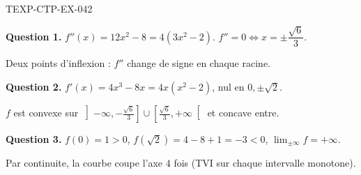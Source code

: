 \begin{corrige}{TEXP-CTP-EX-042}

\textbf{Question 1.} $f''(x) = 12x^2 - 8 = 4(3x^2-2)$. $f'' = 0 \iff x = \pm\dfrac{\sqrt{6}}{3}$.


Deux points d'inflexion : $f''$ change de signe en chaque racine.

\textbf{Question 2.} $f'(x) = 4x^3 - 8x = 4x(x^2-2)$, nul en $0, \pm\sqrt{2}$.

$f$ est convexe sur $\left]-\infty, -\frac{\sqrt6}{3}\right] \cup \left[\frac{\sqrt6}{3}, +\infty\right[$ et concave entre.

\textbf{Question 3.} $f(0)=1>0$, $f(\sqrt2) = 4-8+1 = -3 < 0$, $\lim_{\pm\infty} f = +\infty$.

Par continuite, la courbe coupe l'axe $4$ fois (TVI sur chaque intervalle monotone).

\end{corrige}
